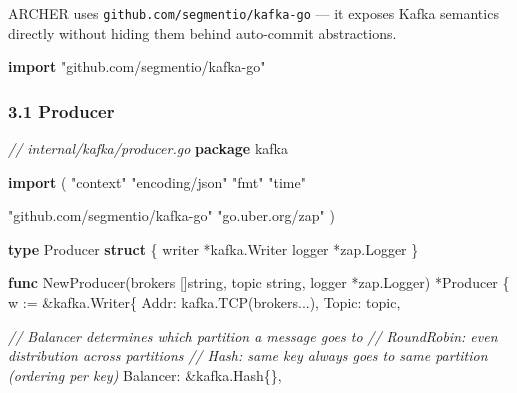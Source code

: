 \documentclass[
]{article}
\newenvironment{Shaded}{}{}
\newcommand{\CommentTok}[1]{\textcolor[rgb]{0.38,0.63,0.69}{\textit{#1}}}
\newcommand{\DataTypeTok}[1]{\textcolor[rgb]{0.56,0.13,0.00}{#1}}
\newcommand{\KeywordTok}[1]{\textcolor[rgb]{0.00,0.44,0.13}{\textbf{#1}}}
\newcommand{\NormalTok}[1]{#1}
\newcommand{\OperatorTok}[1]{\textcolor[rgb]{0.40,0.40,0.40}{#1}}
\newcommand{\StringTok}[1]{\textcolor[rgb]{0.25,0.44,0.63}{#1}}
\begin{document}
ARCHER uses \texttt{github.com/segmentio/kafka-go} --- it exposes Kafka
semantics directly without hiding them behind auto-commit abstractions.

\begin{Shaded}
\begin{Highlighting}[]
\KeywordTok{import} \StringTok{"github.com/segmentio/kafka{-}go"}
\end{Highlighting}
\end{Shaded}

\hypertarget{producer}{%
\subsubsection{3.1 Producer}\label{producer}}

\begin{Shaded}
\begin{Highlighting}[]
\CommentTok{// internal/kafka/producer.go}
\KeywordTok{package}\NormalTok{ kafka}

\KeywordTok{import} \OperatorTok{(}
    \StringTok{"context"}
    \StringTok{"encoding/json"}
    \StringTok{"fmt"}
    \StringTok{"time"}

    \StringTok{"github.com/segmentio/kafka{-}go"}
    \StringTok{"go.uber.org/zap"}
\OperatorTok{)}

\KeywordTok{type}\NormalTok{ Producer }\KeywordTok{struct} \OperatorTok{\{}
\NormalTok{    writer }\OperatorTok{*}\NormalTok{kafka}\OperatorTok{.}\NormalTok{Writer}
\NormalTok{    logger }\OperatorTok{*}\NormalTok{zap}\OperatorTok{.}\NormalTok{Logger}
\OperatorTok{\}}

\KeywordTok{func}\NormalTok{ NewProducer}\OperatorTok{(}\NormalTok{brokers }\OperatorTok{[]}\DataTypeTok{string}\OperatorTok{,}\NormalTok{ topic }\DataTypeTok{string}\OperatorTok{,}\NormalTok{ logger }\OperatorTok{*}\NormalTok{zap}\OperatorTok{.}\NormalTok{Logger}\OperatorTok{)} \OperatorTok{*}\NormalTok{Producer }\OperatorTok{\{}
\NormalTok{    w }\OperatorTok{:=} \OperatorTok{\&}\NormalTok{kafka}\OperatorTok{.}\NormalTok{Writer}\OperatorTok{\{}
\NormalTok{        Addr}\OperatorTok{:}\NormalTok{  kafka}\OperatorTok{.}\NormalTok{TCP}\OperatorTok{(}\NormalTok{brokers}\OperatorTok{...),}
\NormalTok{        Topic}\OperatorTok{:}\NormalTok{ topic}\OperatorTok{,}

        \CommentTok{// Balancer determines which partition a message goes to}
        \CommentTok{// RoundRobin: even distribution across partitions}
        \CommentTok{// Hash: same key always goes to same partition (ordering per key)}
\NormalTok{        Balancer}\OperatorTok{:} \OperatorTok{\&}\NormalTok{kafka}\OperatorTok{.}\NormalTok{Hash}\OperatorTok{\{\},}


\end{Highlighting}
\end{Shaded}
\end{document}
